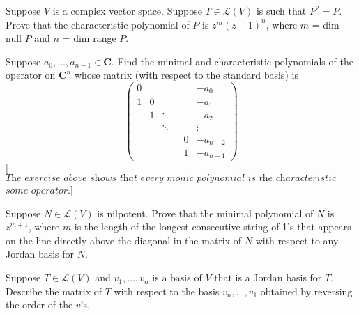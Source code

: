 \documentclass[12pt,letterpaper,boxed]{hmcpset}
\begin{document}

\begin{problem}[7]
Suppose $V$ is a complex vector space. Suppose $ T \in \mathcal{L}(V) $ is such that $P^2 = P$. Prove that the characteristic polynomial of $P$ is $z^m(z-1)^n$, where $m$ = dim null $P$ and $n$ = dim range $P$.
\end{problem}

\begin{solution}

\end{solution}

\clearpage

\begin{problem}[18]
Suppose $a_0,...,a_{n-1} \in \textbf{C}$. Find the minimal and characteristic polynomials of the operator on $\textbf{C}^n$ whose matrix (with respect to the standard basis) is
$$\begin{pmatrix}
0  &   &        &  &   & -a_0  \\
1  & 0 &        &  &   & -a_1 \\
   & 1 & \ddots &  & 	  &  -a_2  \\
   &   & \ddots &  &   & \vdots  \\
   &   &        &  & 0 & -a_{n-2} \\
   &   &        &  & 1 & -a_{n-1}
\end{pmatrix}$$
[$\textit{The exercise above shows that every monic polynomial is the characteristic polynomial of}$
\newline $\textit{some operator}$.]
\end{problem}

\begin{solution}
\end{solution}

\clearpage

\begin{problem}[3]
Suppose $N \in \mathcal{L}(V)$ is nilpotent. Prove that the minimal polynomial of $N$ is $z^{m+1}$, where $m$ is the length of the longest consecutive string of 1's that appears on the line directly above the diagonal in the matrix of $N$ with respect to any Jordan basis for $N$.
\end{problem}

\begin{solution}
\end{solution}

\clearpage


\begin{problem}[4]
Suppose $T \in \mathcal{L}(V)$ and $v_1,...,v_n$ is a basis of $V$ that is a Jordan basis for $T$. Describe the matrix of $T$ with respect to the basis $v_n,...,v_1$ obtained by reversing the order of the $v$'s.
\end{problem}
\end{document}
